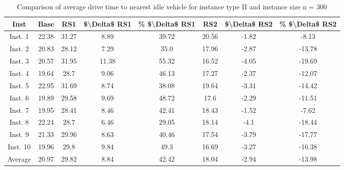 \begin{table}[H]
\centering
\begin{tabular}{cccccccc}
  \hline
  \textbf{Inst} & \textbf{Base} & \textbf{RS1} & \textbf{\$\textbackslash{}Delta\$  RS1} & \textbf{\% \$\textbackslash{}Delta\$  RS1} & \textbf{RS2} & \textbf{\$\textbackslash{}Delta\$  RS2} & \textbf{\% \$\textbackslash{}Delta\$  RS2} \\\hline
  Inst. 1 & 22.38 & 31.27 & 8.89 & 39.72 & 20.56 & -1.82 & -8.13 \\
  Inst. 2 & 20.83 & 28.12 & 7.29 & 35.0 & 17.96 & -2.87 & -13.78 \\
  Inst. 3 & 20.57 & 31.95 & 11.38 & 55.32 & 16.52 & -4.05 & -19.69 \\
  Inst. 4 & 19.64 & 28.7 & 9.06 & 46.13 & 17.27 & -2.37 & -12.07 \\
  Inst. 5 & 22.95 & 31.69 & 8.74 & 38.08 & 19.64 & -3.31 & -14.42 \\
  Inst. 6 & 19.89 & 29.58 & 9.69 & 48.72 & 17.6 & -2.29 & -11.51 \\
  Inst. 7 & 19.95 & 28.41 & 8.46 & 42.41 & 18.43 & -1.52 & -7.62 \\
  Inst. 8 & 22.24 & 28.7 & 6.46 & 29.05 & 18.14 & -4.1 & -18.44 \\
  Inst. 9 & 21.33 & 29.96 & 8.63 & 40.46 & 17.54 & -3.79 & -17.77 \\
  Inst. 10 & 19.96 & 29.8 & 9.84 & 49.3 & 16.69 & -3.27 & -16.38 \\
  Average & 20.97 & 29.82 & 8.84 & 42.42 & 18.04 & -2.94 & -13.98 \\\hline
\end{tabular}
\caption{Comparison of average drive time to nearest idle vehicle for instance type II and instance size n = 300}
\label{tab:wait:resrelocation-nearest-drive-time-comparison_II_300}
\end{table}
